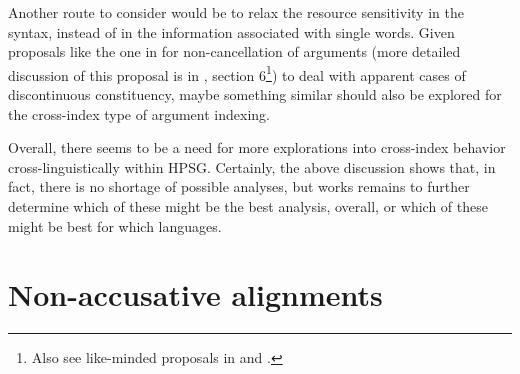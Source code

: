 \documentclass[output=paper]{langsci/langscibook}
\begin{document}
{Another route to consider would be to relax the resource sensitivity in the syntax, instead of in the information associated with single words. Given proposals like the one in \citealt{Bender2008a} for non-cancellation of arguments (more detailed discussion of this proposal is in , section 6\footnote{Also see like-minded proposals in \citealt{Meurers99b} and \citealt{Mueller2008a}.}) to deal with apparent cases of discontinuous constituency, maybe something similar should also be explored for the cross-index type of argument indexing. 

Overall, there seems to be a need for more explorations into cross-index behavior cross-linguistically within HPSG. Certainly, the above discussion shows that, in fact, there is no shortage of possible analyses, but works remains to further determine which of these might be the best analysis, overall, or which of these might be best for which languages.

\section{Non-accusative alignments}

}
\end{document}
